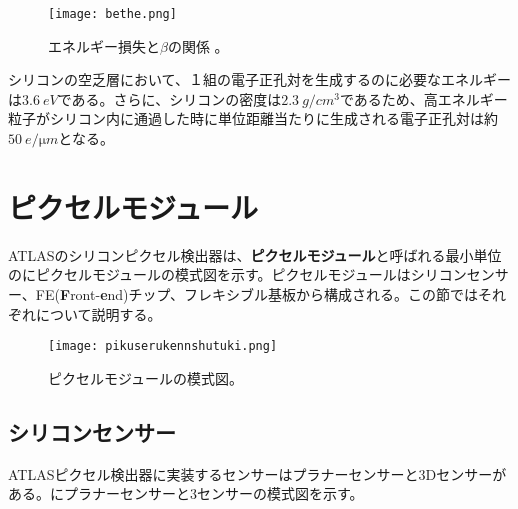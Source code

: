 \begin{figure}[tbp]
  \centering
  \texttt{[image: bethe.png]}
  \caption[エネルギー損失と$\beta$の関係。]{エネルギー損失と$\beta$の関係 \cite{bethe}。}
  \label{fig:bethe}
\end{figure}

シリコンの空乏層において、１組の電子正孔対を生成するのに必要なエネルギーは$3.6\ \si{eV}$である。さらに、シリコンの密度は$2.3\ \si{g/cm^3}$であるため、高エネルギー粒子がシリコン内に通過した時に単位距離当たりに生成される電子正孔対は約$50\ \si{e / \micro m}$となる。


\section{ピクセルモジュール}
\label{sec:pixelkenshutuki}

ATLASのシリコンピクセル検出器は、\textbf{ピクセルモジュール}と呼ばれる最小単位のにピクセルモジュールの模式図を示す。ピクセルモジュールはシリコンセンサー、FE(\textbf{F}ront-\textbf{e}nd)チップ、フレキシブル基板から構成される。この節ではそれぞれについて説明する。

\begin{figure}[tbp]
  \centering
  \texttt{[image: pikuserukennshutuki.png]}
  \caption[ピクセルモジュールの模式図]{ピクセルモジュールの模式図。}
  \label{fig:pikuserukennshutuki}
\end{figure}

\subsection{シリコンセンサー}
\label{sec:silicon}
ATLASピクセル検出器に実装するセンサーはプラナーセンサーと3Dセンサーがある。にプラナーセンサーと3センサーの模式図を示す。

